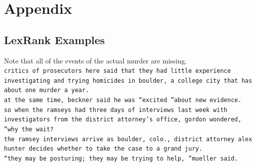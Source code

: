 \documentclass[11pt]{article}
\begin{document}
\section{Appendix}
\subsection{LexRank Examples}
Note that all of the events of the actual murder are missing.\\
\texttt{critics of prosecutors here said that they had little experience investigating and trying homicides in boulder, a college city that has about one murder a year.\\
at the same time, beckner said he was ``excited ''about new evidence.\\
so when the ramseys had three days of interviews last week with investigators from the district attorney's office, gordon wondered, ``why the wait?\\
the ramsey interviews arrive as boulder, colo., district attorney alex hunter decides whether to take the case to a grand jury.\\
``they may be posturing; they may be trying to help, ''mueller said.}
\end{document}

